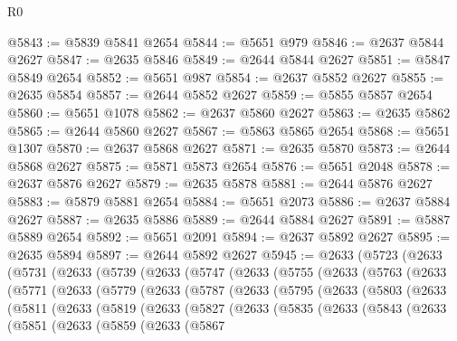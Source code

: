 \begin{lexlean}{R0}
\begin{coremodule}
@5843 := @5839 @5841 @2654
@5844 := @5651 @979
@5846 := @2637 @5844 @2627
@5847 := @2635 @5846
@5849 := @2644 @5844 @2627
@5851 := @5847 @5849 @2654
@5852 := @5651 @987
@5854 := @2637 @5852 @2627
@5855 := @2635 @5854
@5857 := @2644 @5852 @2627
@5859 := @5855 @5857 @2654
@5860 := @5651 @1078
@5862 := @2637 @5860 @2627
@5863 := @2635 @5862
@5865 := @2644 @5860 @2627
@5867 := @5863 @5865 @2654
@5868 := @5651 @1307
@5870 := @2637 @5868 @2627
@5871 := @2635 @5870
@5873 := @2644 @5868 @2627
@5875 := @5871 @5873 @2654
@5876 := @5651 @2048
@5878 := @2637 @5876 @2627
@5879 := @2635 @5878
@5881 := @2644 @5876 @2627
@5883 := @5879 @5881 @2654
@5884 := @5651 @2073
@5886 := @2637 @5884 @2627
@5887 := @2635 @5886
@5889 := @2644 @5884 @2627
@5891 := @5887 @5889 @2654
@5892 := @5651 @2091
@5894 := @2637 @5892 @2627
@5895 := @2635 @5894
@5897 := @2644 @5892 @2627
@5945 := @2633
    (@5723
      (@2633
        (@5731
          (@2633
            (@5739
              (@2633
                (@5747
                  (@2633
                    (@5755
                      (@2633
                        (@5763
                          (@2633
                            (@5771
                              (@2633
                                (@5779
                                  (@2633
                                    (@5787
                                      (@2633
                                        (@5795
                                          (@2633
                                            (@5803
                                              (@2633
                                                (@5811
                                                  (@2633
                                                    (@5819
                                                      (@2633
                                                        (@5827
                                                          (@2633
                                                            (@5835
                                                              (@2633
                                                                (@5843
                                                                  (@2633
                                                                    (@5851
                                                                      (@2633
                                                                        (@5859
                                                                          (@2633
                                                                            (@5867

\end{coremodule}
\end{lexlean}
